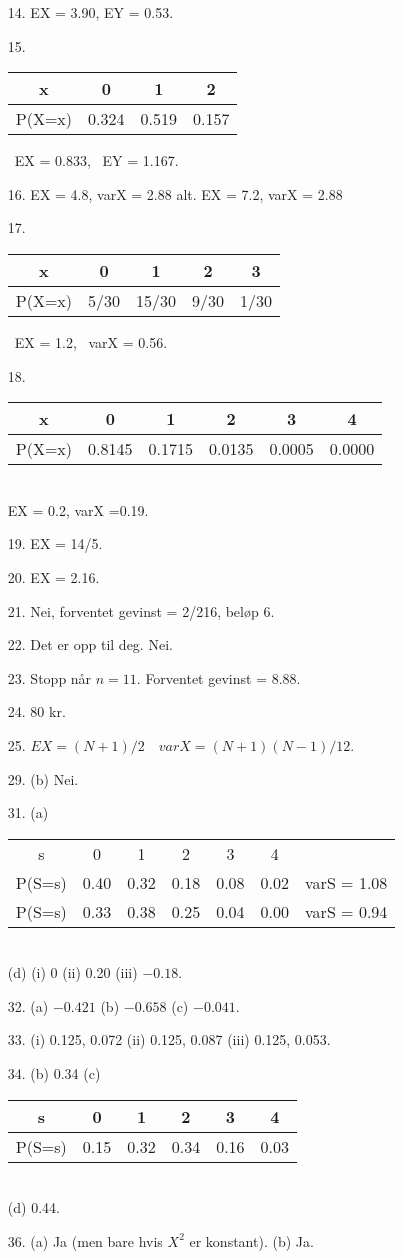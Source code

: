 \begin{itemize}
\item[14.]  EX = 3.90,    EY = 0.53.
\item[15.] \begin{tabular}{c|ccc}
            x &  0 & 1 & 2   \\ \hline
P(X=x) &0.324&0.519&0.157
         \end{tabular} \ EX = 0.833, \ EY = 1.167.
\item[16.]  EX = 4.8,   varX = 2.88    alt.  EX = 7.2,   varX = 2.88
\item[17.] \begin{tabular}{c|cccc}
            x &  0 & 1 & 2 &  3  \\ \hline
P(X=x) &5/30&15/30&9/30&1/30
         \end{tabular} \ EX = 1.2, \ varX = 0.56.
\item[18.] \begin{tabular}{c|ccccc}
            x &  0 & 1 & 2 &  3 & 4  \\ \hline
P(X=x) &0.8145&0.1715&0.0135&0.0005&0.0000
         \end{tabular} \\ EX = 0.2, varX =0.19.
\item[19.]  EX = 14/5.
\item[20.]  EX = 2.16.
\item[21.]  Nei, forventet gevinst = 2/216, beløp 6.
\item[22.]  Det er opp til deg.  Nei.
\item[23.]  Stopp når $n=11$. Forventet gevinst = 8.88.
\item[24.]  80 kr.
\item[25.]  $EX = (N+1)/2$\ \    $varX = (N+1)(N-1)/12$.
\item[29.]  (b)  Nei.
                                                   
\item[31.]  (a)  \begin{tabular}{c|cccccc}
            s &  0 & 1 & 2 &  3 & 4 &   \\ \cline{1-6}
P(S=s) &0.40&0.32&0.18&0.08&0.02 & varS = 1.08\\
P(S=s) &0.33&0.38&0.25&0.04&0.00 & varS = 0.94
         \end{tabular}\\
         (d)  (i) 0   (ii) 0.20   (iii) $-0.18$.
\item[32.]  (a)  $-0.421$    (b)  $-0.658$    (c)  $-0.041$.
\item[33.]  (i)  0.125, 0.072  (ii)  0.125, 0.087  (iii)  0.125, 0.053.
\item[34.]  (b)  0.34  (c) \begin{tabular}{c|ccccc}
            s &  0 & 1 & 2 &  3 & 4    \\ \hline
P(S=s) &0.15&0.32&0.34&0.16&0.03 
         \end{tabular}\\
              (d)  0.44.
\item[36.]  (a)  Ja (men bare hvis $X^2$  er konstant).   (b) Ja.
         

\end{itemize}
